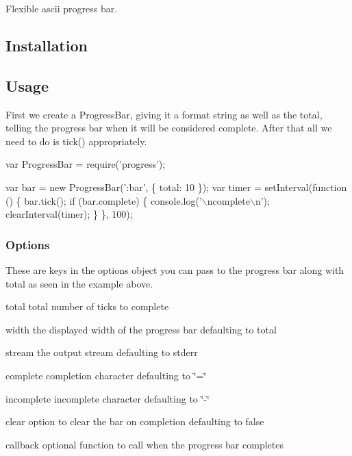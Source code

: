 Flexible ascii progress bar.

\subsection*{Installation}




\subsection*{Usage}

First we create a {\ttfamily Progress\+Bar}, giving it a format string as well as the {\ttfamily total}, telling the progress bar when it will be considered complete. After that all we need to do is {\ttfamily tick()} appropriately.


\begin{DoxyCode}
var ProgressBar = require('progress');

var bar = new ProgressBar(':bar', \{ total: 10 \});
var timer = setInterval(function () \{
  bar.tick();
  if (bar.complete) \{
    console.log('\(\backslash\)ncomplete\(\backslash\)n');
    clearInterval(timer);
  \}
\}, 100);
\end{DoxyCode}


\subsubsection*{Options}

These are keys in the options object you can pass to the progress bar along with {\ttfamily total} as seen in the example above.


\begin{DoxyItemize}
\item {\ttfamily total} total number of ticks to complete
\item {\ttfamily width} the displayed width of the progress bar defaulting to total
\item {\ttfamily stream} the output stream defaulting to stderr
\item {\ttfamily complete} completion character defaulting to \char`\"{}=\char`\"{}
\item {\ttfamily incomplete} incomplete character defaulting to \char`\"{}-\/\char`\"{}
\item {\ttfamily clear} option to clear the bar on completion defaulting to false
\item {\ttfamily callback} optional function to call when the progress bar completes
\end{DoxyItemize}

